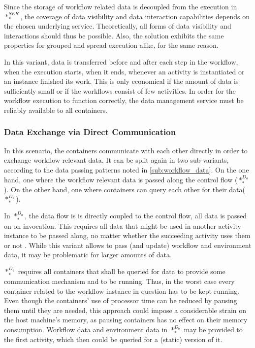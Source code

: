    Since the storage of workflow related data is decoupled from the execution in $*_{*}^{SER}$, the coverage of data visibility and data interaction capabilities depends on the chosen underlying service. Theoretically, all forms of data visibility and interactions should thus be possible. Also, the solution exhibits the same properties for grouped and spread execution alike, for the same reason.

    In this variant, data is transferred before and after each step in the workflow, \ie when the execution starts, when it ends, whenever an activity is instantiated or an instance finished its work. This is only economical if the amount of data is sufficiently small or if the workflows consist of few activities. In order for the workflow execution to function correctly, the data management service must be reliably available to all containers.

  \subsubsection{Data Exchange via Direct Communication} %
  \label{ssub:data_exchange_via_direct_communication}
    In this scenario, the containers communicate with each other directly in order to exchange workflow relevant data. It can be split again in two sub-variants, according to the data passing patterns noted in \ref{sub:workflow_data}. On the one hand, one where the workflow relevant data is passed along the control flow ($*_{*}^{D_a}$). On the other hand, one where containers can query each other for their data($*_{*}^{D_b}$).

    In $*_{*}^{D_a}$, the data flow is is directly coupled to the control flow, \ie all data is passed on on invocation. This requires all data that might be used in another activity instance to be passed along, no matter whether the succeeding activity uses them or not \cite{Russell2005Workflow}. While this variant allows to pass (and update) workflow and environment data, it may be problematic for larger amounts of data.

    $*_{*}^{D_b}$ requires all containers that shall be queried for data to provide some communication mechanism and to be running. Thus, in the worst case every container related to the workflow instance in question has to be kept running. Even though the containers' use of processor time can be reduced by pausing them until they are needed, this approach could impose a considerable strain on the host machine's memory, as pausing containers has no effect on their memory consumption.
    Workflow data and environment data in $*_{*}^{D_b}$ may be provided to the first activity, which then could be queried for a (static) version of it.

